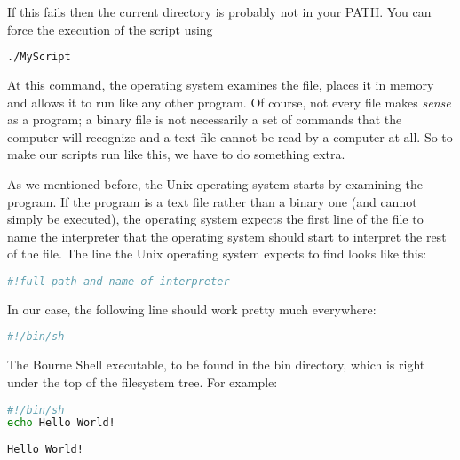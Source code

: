 If this fails then the current directory is probably not in your PATH.  You can
force the execution of the script using
\lstset{basicstyle=\scriptsize, numbers=left, captionpos=b, tabsize=4}
\begin{lstlisting}[caption=Making the shell look for your script in the current directory,language={bash},
xleftmargin=15pt, label=lst:Making the shell look for your script in the current directory]
./MyScript
\end{lstlisting}

At this command, the operating system examines the file, places it in memory
and allows it to run like any other program. Of course, not every file makes
\textit{sense} as a program; a binary file is not necessarily a set of commands
that the computer will recognize and a text file cannot be read by a computer
at all. So to make our scripts run like this, we have to do something extra.

As we mentioned before, the Unix operating system starts by examining the
program. If the program is a text file rather than a binary one (and cannot
simply be executed), the operating system expects the first line of the file to
name the interpreter that the operating system should start to interpret the
rest of the file. The line the Unix operating system expects to find looks like
this:

\lstset{basicstyle=\scriptsize, numbers=left, captionpos=b, tabsize=4}
\begin{lstlisting}[language={bash},
xleftmargin=15pt]
#!full path and name of interpreter
\end{lstlisting}

In our case, the following line should work pretty much everywhere:
\lstset{basicstyle=\scriptsize, numbers=left, captionpos=b, tabsize=4}
\begin{lstlisting}[language={bash},
xleftmargin=15pt]
#!/bin/sh
\end{lstlisting}

The Bourne Shell executable, to be found in the bin directory, which is right
under the top of the filesystem tree. For example:
\lstset{basicstyle=\scriptsize, numbers=left, captionpos=b, tabsize=4}
\begin{lstlisting}[caption=Bourne shell script with an explicit interpreter,language={bash},
xleftmargin=15pt, label=lst:Bourne shell script with an explicit interpreter]
#!/bin/sh
echo Hello World!
\end{lstlisting}

\scriptsize
\begin{verbatim}
Hello World!
\end{verbatim}
\normalsize

